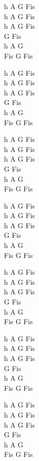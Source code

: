 \begin{chord}
\footnotesize{
    h A G Fis\\
    h A G Fis\\
    h A G Fis\\
    G Fis\\
    h A G\\
    Fis G Fis

    h A G Fis\\
    h A G Fis\\
    h A G Fis\\
    G Fis\\
    h A G\\
    Fis G Fis

    h A G Fis\\
    h A G Fis\\
    h A G Fis\\
    G Fis\\
    h A G\\
    Fis G Fis

    h A G Fis\\
    h A G Fis\\
    h A G Fis\\
    G Fis\\
    h A G\\
    Fis G Fis

    h A G Fis\\
    h A G Fis\\
    h A G Fis\\
    G Fis\\
    h A G\\
    Fis G Fis

    h A G Fis\\
    h A G Fis\\
    h A G Fis\\
    G Fis\\
    h A G\\
    Fis G Fis

    h A G Fis\\
    h A G Fis\\
    h A G Fis\\
    G Fis\\
    h A G\\
    Fis G Fis
}
\end{chord}